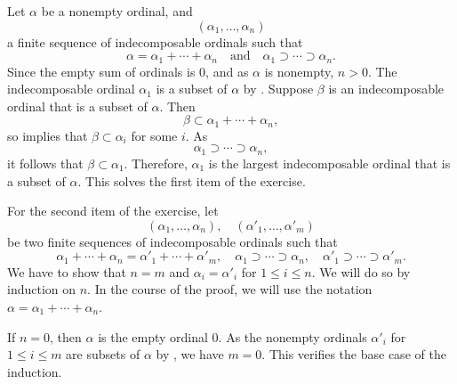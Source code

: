 \documentclass{article}
\begin{document}
\begin{solution}[\ref{exe:fdb94svq}]
  \label{sol:mb1t9epx}
  Let \(\alpha\) be a nonempty ordinal, and
  \begin{displaymath}
    (\alpha_1, \dotsc, \alpha_n)
  \end{displaymath}
  a finite sequence of indecomposable ordinals such that
  \begin{displaymath}
    \alpha = \alpha_1 + \dotsb + \alpha_n
    \quad \text{and} \quad
    \alpha_1 \supset \dotsb \supset \alpha_n.
  \end{displaymath}
  Since the empty sum of ordinals is \(0\), and as \(\alpha\) is
  nonempty, \(n > 0\).  The indecomposable ordinal \(\alpha_1\) is a
  subset of \(\alpha\) by .  Suppose \(\beta\) is
  an indecomposable ordinal that is a subset of \(\alpha\).  Then
  \begin{displaymath}
    \beta \subset \alpha_1 + \dotsb + \alpha_n,
  \end{displaymath}
  so  implies that \(\beta \subset \alpha_i\) for
  some \(i\).  As
  \begin{displaymath}
    \alpha_1 \supset \dotsb \supset \alpha_n,
  \end{displaymath}
  it follows that \(\beta \subset \alpha_1\).  Therefore, \(\alpha_1\)
  is the largest indecomposable ordinal that is a subset of
  \(\alpha\).  This solves the first item of the exercise.

  For the second item of the exercise, let
  \begin{displaymath}
    (\alpha_1, \dotsc, \alpha_n),
    \quad
    (\alpha'_1, \dotsc, \alpha'_m)
  \end{displaymath}
  be two finite sequences of indecomposable ordinals such that
  \begin{displaymath}
    \alpha_1 + \dotsb + \alpha_n = \alpha'_1 + \dotsb + \alpha'_m,
    \quad
    \alpha_1 \supset \dotsb \supset \alpha_n,
    \quad
    \alpha'_1 \supset \dotsb \supset \alpha'_m.
  \end{displaymath}
  We have to show that \(n = m\) and \(\alpha_i = \alpha'_i\) for
  \(1 \leq i \leq n\).  We will do so by induction on \(n\).  In the
  course of the proof, we will use the notation
  \(\alpha = \alpha_1 + \dotsb + \alpha_n\).

  If \(n = 0\), then \(\alpha\) is the empty ordinal \(0\).  As the
  nonempty ordinals \(\alpha'_i\) for \(1 \leq i \leq m\) are subsets
  of \(\alpha\) by , we have \(m = 0\).  This
  verifies the base case of the induction.


\end{solution}
\end{document}
